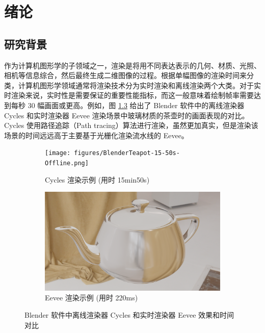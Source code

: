 
\chapter{绪论}

\section{研究背景}

作为计算机图形学的子领域之一，渲染是将用不同表达表示的几何、材质、光照、相机等信息综合，然后最终生成二维图像的过程。根据单幅图像的渲染时间来分类，计算机图形学领域通常将渲染技术分为实时渲染和离线渲染两个大类。对于实时渲染来说，实时性是需要保证的重要性能指标，而这一般意味着绘制帧率需要达到每秒 30 幅画面或更高。例如，图 \ref{fig:blender_online_vs_offline} 给出了 Blender 软件中的离线渲染器 Cycles 和实时渲染器 Eevee 渲染场景中玻璃材质的茶壶时的画面表现的对比。Cycles 使用路径追踪（Path tracing）算法进行渲染，虽然更加真实，但是渲染该场景的时间远远高于主要基于光栅化渲染流水线的 Eevee。

\begin{figure}[htbp]
    \centering
    \begin{minipage}[b]{\textwidth}
        \begin{subfigure}[b]{0.48\textwidth}
            \texttt{[image: figures/BlenderTeapot-15-50s-Offline.png]}
            \caption{Cycles 渲染示例 (用时 15min50s)}
            \label{fig:sub_cycles}
        \end{subfigure}
        \hfill %
        \begin{subfigure}[b]{0.48\textwidth}
            \includegraphics[width=\textwidth]{figures/BlenderTeapot-220ms-Online.png}
            \caption{Eevee 渲染示例 (用时 220ms)}
            \label{fig:sub_eevee}
        \end{subfigure}
    \end{minipage}
    
    
    \caption{Blender 软件中离线渲染器 Cycles 和实时渲染器 Eevee 效果和时间对比}
    \label{fig:blender_online_vs_offline}
\end{figure}


